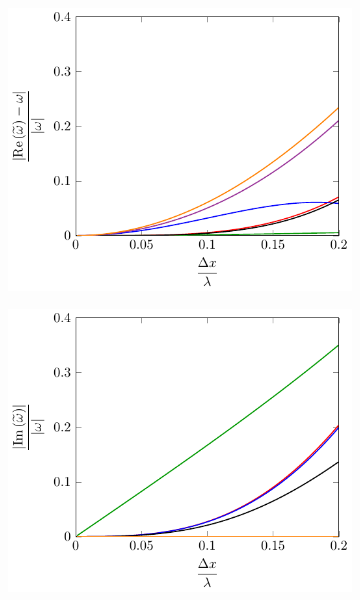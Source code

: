 \begin{figure}
	\centering
	\begin{subfigure}{0.5\textwidth}
		\includegraphics[width=\textwidth]{./chp4/figures/Dispu0khShallRez.pdf}
	\end{subfigure}%
	\begin{subfigure}{0.5\textwidth}
		\includegraphics[width=\textwidth]{./chp4/figures/Dispu0khShallImz.pdf}
	\end{subfigure}
	\par\bigskip

\end{figure}
